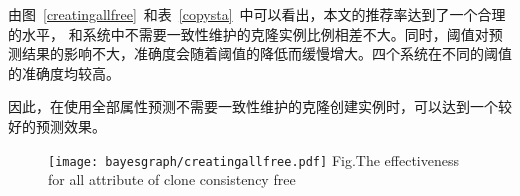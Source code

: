 由图~\ref{creatingallfree}~和表~\ref{copysta}~中可以看出，本文的推荐率达到了一个合理的水平， 和系统中不需要一致性维护的克隆实例比例相差不大。同时，阈值对预测结果的影响不大，准确度会随着阈值的降低而缓慢增大。四个系统在不同的阈值的准确度均较高。

因此，在使用全部属性预测不需要一致性维护的克隆创建实例时，可以达到一个较好的预测效果。

\begin{figure}[htbp]
\centering
\texttt{[image: bayesgraph/creatingallfree.pdf]}
{Fig.$\!$}{The effectiveness for all attribute of clone consistency free}
\vspace{-1em}
\end{figure}


